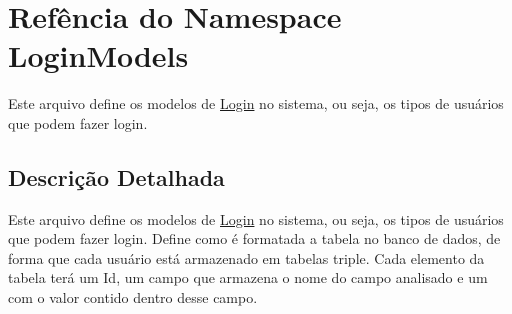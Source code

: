 \hypertarget{namespaceLoginModels}{\section{Refência do Namespace Login\-Models}
\label{namespaceLoginModels}
}


Este arquivo define os modelos de \hyperlink{namespaceLogin}{Login} no sistema, ou seja, os tipos de usuários que podem fazer login.  




\subsection{Descrição Detalhada}
Este arquivo define os modelos de \hyperlink{namespaceLogin}{Login} no sistema, ou seja, os tipos de usuários que podem fazer login. Define como é formatada a tabela no banco de dados, de forma que cada usuário está armazenado em tabelas triple. Cada elemento da tabela terá um Id, um campo que armazena o nome do campo analisado e um com o valor contido dentro desse campo. 